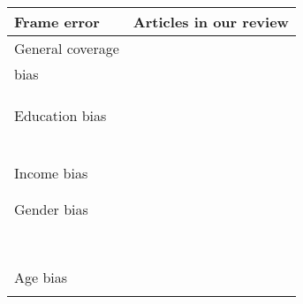\begin{table}
    \centering
	\begin{tabular}{ll}
		\toprule
		Frame error & Articles in our review\\
		\midrule
        General coverage & \cite{keusch_coverage_2020, revilla_online_2016}\\
        bias & \cite{gummer_does_2019, bucher_exploring_2021}\\
        & \cite{de_bruijne_mobile_2014}\\
        & \cite{fuchs_coverage_2009}\\
        & \cite{wells_what_2015}\\
        Education bias & \cite{de_bruijne_comparing_2013, keusch_coverage_2020}\\
        & \cite{gummer_does_2019}\\
        & \cite{de_bruijne_mobile_2014}\\
        & \cite{zou_mobile_2021}\\
        & \cite{skeie_smartphone_2019}\\
        & \cite{keusch_using_2021, keusch_web_2017}\\
        & \cite{toepoel_what_2014, wenz_willingness_2019}\\
        Income bias & \cite{haan_can_2019, zou_mobile_2021}\\
        & \cite{ skeie_smartphone_2019, toepoel_what_2014}\\
        & \cite{wenz_willingness_2019}\\
        Gender bias & \cite{haan_can_2019, de_bruijne_comparing_2013}\\
        & \cite{wells_comparison_2014, keusch_coverage_2020}\\
        & \cite{liebe_does_2015, lambert_living_2015}\\
        & \cite{bosch_measurement_2019}\\
    	& \cite{schlosser_mobile_2018}\\
        & \cite{de_bruijne_mobile_2014, zou_mobile_2021}\\
        & \cite{brosnan_pc_2017, skeie_smartphone_2019}\\
        & \cite{keusch_web_2017, toepoel_what_2014}\\
        & \cite{wenz_willingness_2019}\\
        Age bias & \cite{haan_can_2019, de_bruijne_comparing_2013}\\
        & \cite{wells_comparison_2014, keusch_coverage_2020}\\

\end{tabular}
\end{table}
